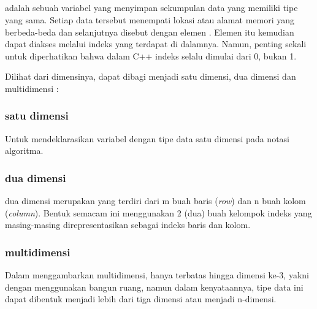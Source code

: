 \documentclass{subfiles}
\begin{document}
    \subsection{{\sArray}}
    {\sArray} adalah sebuah variabel yang menyimpan sekumpulan data yang memiliki tipe yang sama. Setiap data tersebut menempati lokasi atau alamat memori yang berbeda-beda dan selanjutnya disebut dengan elemen {\sarray}. Elemen {\sarray} itu kemudian dapat diakses melalui indeks yang terdapat di dalamnya. Namun, penting sekali untuk diperhatikan bahwa dalam C++ indeks {\sarray} selalu dimulai dari 0, bukan 1\parencite{raharjo2015pemrograman}.

    Dilihat dari dimensinya, {\sarray} dapat dibagi menjadi {\sarray} satu dimensi, {\sarray} dua dimensi dan {\sarray} multidimensi \parencite{faradiba2019penggunaan}:

    \subsubsection{{\sArray} satu dimensi}

    \begin{indentpar}\hpar{}
        Untuk mendeklarasikan variabel dengan tipe data {\sarray} satu dimensi pada notasi algoritma.
    \end{indentpar}
    \subsubsection{{\sArray} dua dimensi}

    \begin{indentpar}\hpar{}
        {\sArray} dua dimensi merupakan {\sarray} yang terdiri dari m buah baris (\textit{row}) dan n buah kolom (\textit{column}). Bentuk {\sarray} semacam ini menggunakan 2 (dua) buah kelompok indeks yang masing-masing direpresentasikan sebagai indeks baris dan kolom.
    \end{indentpar}
    \subsubsection{{\sArray} multidimensi}

    \begin{indentpar}\hpar{}
        Dalam menggambarkan {\sarray} multidimensi, hanya terbatas hingga dimensi ke-3, yakni dengan menggunakan bangun ruang, namun dalam kenyataannya, tipe data {\sarray} ini dapat dibentuk menjadi lebih dari tiga dimensi atau menjadi n-dimensi.
    \end{indentpar}
\end{document}
